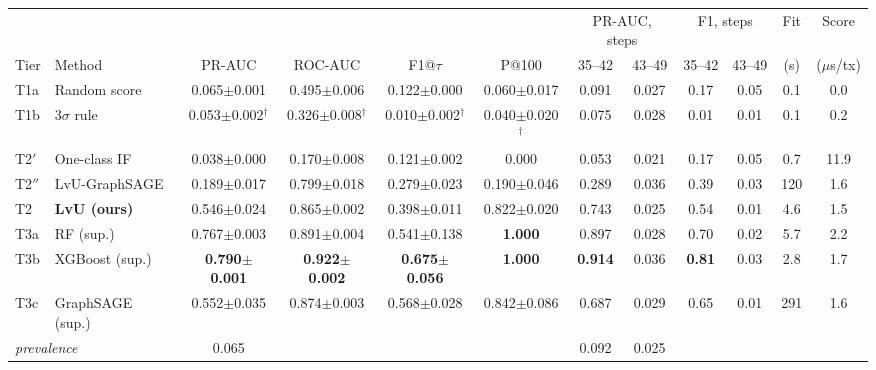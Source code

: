 \begin{tabular}{@{}llcccccccccc@{}}
\toprule
 & & & & & & \multicolumn{2}{c}{PR-AUC, steps} & \multicolumn{2}{c}{F1, steps} & Fit & Score \\
\cmidrule(lr){7-8}\cmidrule(lr){9-10}
Tier & Method & PR-AUC & ROC-AUC & F1@$\tau$ & P@100 & 35--42 & 43--49 & 35--42 & 43--49 & (s) & ($\mu$s/tx) \\
\midrule
T1a & Random score & 0.065$\pm$0.001 & 0.495$\pm$0.006 & 0.122$\pm$0.000 & 0.060$\pm$0.017 & 0.091 & 0.027 & 0.17 & 0.05 & 0.1 & 0.0 \\
T1b & 3$\sigma$ rule & 0.053$\pm$0.002$^\dagger$ & 0.326$\pm$0.008$^\dagger$ & 0.010$\pm$0.002$^\dagger$ & 0.040$\pm$0.020$^\dagger$ & 0.075 & 0.028 & 0.01 & 0.01 & 0.1 & 0.2 \\
\midrule
T2$'$ & One-class IF & 0.038$\pm$0.000 & 0.170$\pm$0.008 & 0.121$\pm$0.002 & 0.000 & 0.053 & 0.021 & 0.17 & 0.05 & 0.7 & 11.9 \\
T2$''$ & LvU-GraphSAGE & 0.189$\pm$0.017 & 0.799$\pm$0.018 & 0.279$\pm$0.023 & 0.190$\pm$0.046 & 0.289 & 0.036 & 0.39 & 0.03 & 120 & 1.6 \\
T2 & \textbf{LvU (ours)} & 0.546$\pm$0.024 & 0.865$\pm$0.002 & 0.398$\pm$0.011 & 0.822$\pm$0.020 & 0.743 & 0.025 & 0.54 & 0.01 & 4.6 & 1.5 \\
\midrule
T3a & RF (sup.) & 0.767$\pm$0.003 & 0.891$\pm$0.004 & 0.541$\pm$0.138 & \textbf{1.000} & 0.897 & 0.028 & 0.70 & 0.02 & 5.7 & 2.2 \\
T3b & XGBoost (sup.) & \textbf{0.790$\pm$0.001} & \textbf{0.922$\pm$0.002} & \textbf{0.675$\pm$0.056} & \textbf{1.000} & \textbf{0.914} & 0.036 & \textbf{0.81} & 0.03 & 2.8 & 1.7 \\
T3c & GraphSAGE (sup.) & 0.552$\pm$0.035 & 0.874$\pm$0.003 & 0.568$\pm$0.028 & 0.842$\pm$0.086 & 0.687 & 0.029 & 0.65 & 0.01 & 291 & 1.6 \\
\multicolumn{2}{l}{\emph{prevalence}} & 0.065 & & & & 0.092 & 0.025 & & & & \\
\bottomrule
\end{tabular}
